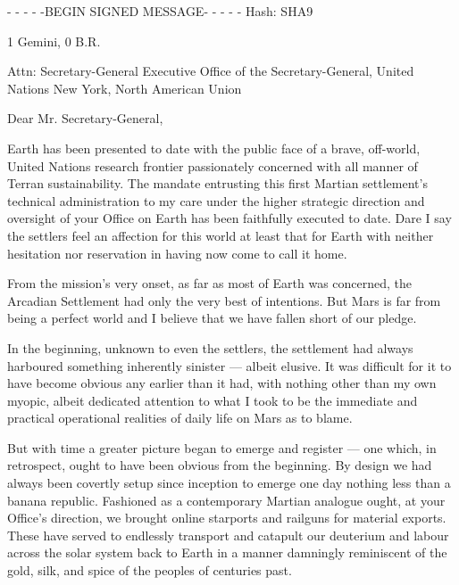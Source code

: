 
\startlines
- - - - -BEGIN SIGNED MESSAGE- - - - -
Hash: SHA9

1 Gemini, 0 B.R.

Attn: Secretary-General
Executive Office of the Secretary-General, United Nations
New York, North American Union
\blank

Dear Mr. Secretary-General,

Earth has been presented to date with the public face of a brave, off-world, United Nations research frontier passionately concerned with all manner of Terran sustainability. The mandate entrusting this first Martian settlement's technical administration to my care under the higher strategic direction and oversight of your Office on Earth has been faithfully executed to date. Dare I say the settlers feel an affection for this world at least that for Earth with neither hesitation nor reservation in having now come to call it home.

From the mission's very onset, as far as most of Earth was concerned, the Arcadian Settlement had only the very best of intentions. But Mars is far from being a perfect world and I believe that we have fallen short of our pledge.

In the beginning, unknown to even the settlers, the settlement had always harboured something inherently sinister — albeit elusive. It was difficult for it to have become obvious any earlier than it had, with nothing other than my own myopic, albeit dedicated attention to what I took to be the immediate and practical operational realities of daily life on Mars as to blame.

But with time a greater picture began to emerge and register — one which, in retrospect, ought to have been obvious from the beginning. By design we had always been covertly setup since inception to emerge one day nothing less than a banana republic. Fashioned as a contemporary Martian analogue ought, at your Office's direction, we brought online starports and railguns for material exports. These have served to endlessly transport and catapult our deuterium and labour across the solar system back to Earth in a manner damningly reminiscent of the gold, silk, and spice of the peoples of centuries past.

